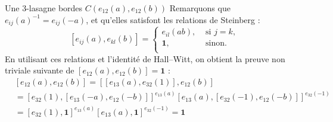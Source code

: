 \documentclass[12pt]{beamer}
\begin{document}
\begin{frame}{Une $3$-lasagne bordes $C(e_{12}(a),e_{12}(b))$}
  \pause
  Remarquons que $e_{ij}(a)^{-1}=e_{ij}(-a)$, et qu’elles satisfont les relations de Steinberg :
  \[
    [e_{ij}(a),e_{kl}(b)]=\begin{cases}
      e_{il}(ab), &\text{ si } j=k,\\
      \mathbf{1}, &\text{ sinon. }\\
    \end{cases}
  \]
  \pause
  En utilisant ces relations et l’identité de Hall--Witt, on obtient la preuve non triviale suivante de $[e_{12}(a),e_{12}(b)]=\mathbf{1}$ :
  {\begin{eqnarray*}
    &[e_{12}(a),e_{12}(b)]=[[e_{13}(a),e_{32}(1)],e_{12}(b)]\\
    &=[e_{32}(1),[e_{13}(-a),e_{12}(-b)]]^{e_{13}(a)}[e_{13}(a),[e_{32}(-1),e_{12}(-b)]]^{e_{32}(-1)}\\
    &=[e_{32}(1),\mathbf{1}]^{e_{13}(a)}[e_{13}(a),\mathbf{1}]^{e_{32}(-1)}=\mathbf{1} 
  \end{eqnarray*}}
\end{frame}
\end{document}
